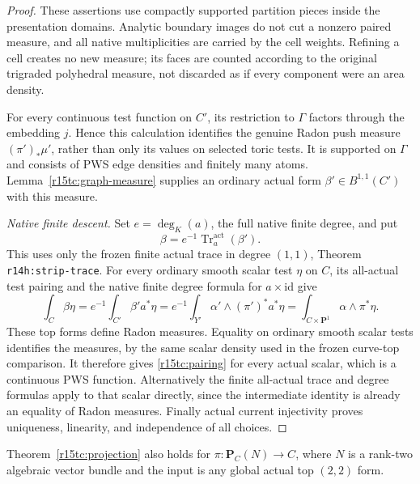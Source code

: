 \begin{proof}
These assertions use compactly supported partition pieces
inside the presentation domains.  Analytic boundary images
do not cut a nonzero paired measure, and all native
multiplicities are carried by the cell weights.  Refining a
cell creates no new measure; its faces are counted according
to the original trigraded polyhedral measure, not discarded
as if every component were an area density.

For every continuous test function on $C'$, its restriction
to $\Gamma$ factors through the embedding $j$.  Hence this
calculation identifies the genuine Radon push measure
$(\pi')_*\mu'$, rather than only its values on selected
toric tests.  It is supported on $\Gamma$ and consists of
PWS edge densities and finitely many atoms.
Lemma~\ref{r15tc:graph-measure} supplies an ordinary actual
form $\beta'\in B^{1,1}(C')$ with this measure.

\emph{Native finite descent.}
Set $e=\deg_K(a)$, the full native finite degree, and put
\[
               \beta=e^{-1}\operatorname{Tr}^{\mathrm{act}}_a
                                      (\beta').
\tag{TC15.7}\label{r15tc:trace}
\]
This uses only the frozen finite actual trace in degree
$(1,1)$, Theorem \texttt{r14h:strip-trace}.  For every
ordinary smooth scalar test $\eta$ on $C$, its all-actual
test pairing and the native finite degree formula for
$a\times\mathrm{id}$ give
\[
 \int_C\beta\eta
 =e^{-1}\int_{C'}\beta'a^*\eta
 =e^{-1}\int_{Y'}\alpha'\wedge(\pi')^*a^*\eta
 =\int_{C\times\mathbf P^1}\alpha\wedge\pi^*\eta.
\tag{TC15.8}\label{r15tc:native-pairing}
\]
These top forms define Radon measures.  Equality on ordinary
smooth scalar tests identifies the measures, by the same
scalar density used in the frozen curve-top comparison.
It therefore gives \eqref{r15tc:pairing} for every actual
scalar, which is a continuous PWS function.  Alternatively
the finite all-actual trace and degree formulas apply to
that scalar directly, since the intermediate identity is
already an equality of Radon measures.  Finally actual
current injectivity proves uniqueness, linearity, and
independence of all choices.
\end{proof}

\begin{corollary}
\label{r15tc:bundle}
Theorem~\ref{r15tc:projection} also holds for
$\pi:\mathbf P_C(N)\to C$, where $N$ is a rank-two
algebraic vector bundle and the input is any global actual
top $(2,2)$ form.
\end{corollary}

